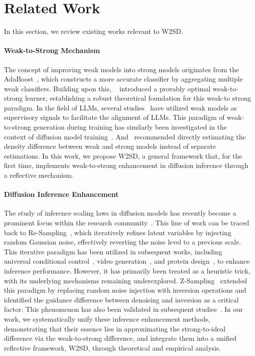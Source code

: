 \section{Related Work}
\label{sec:related_work}
In this section, we review existing works relevant to W2SD.

\paragraph{Weak-to-Strong Mechanism} The concept of improving weak models into strong models originates from the AdaBoost~\citep{hogsgaard2023adaboost}, which constructs a more accurate classifier by aggregating multiple weak classifiers. Building upon this, ~\citet{green2022optimal,hogsgaard2023adaboost} introduced a provably optimal weak-to-strong learner, establishing a robust theoretical foundation for this weak-to strong paradigm. In the field of LLMs, several studies~\citep{chenself,burns2023weak} have utilized weak models as supervisory signals to facilitate the alignment of LLMs. This paradigm of weak-to-strong generation during training has similarly been investigated in the context of diffusion model training~\citep{chen2025pixart}. And~\citet{sugiyama2013density} recommended directly estimating the density difference between weak and strong models instead of separate estimations. In this work, we propose W2SD, a general framework that, for the first time, implements weak-to-strong enhancement in diffusion inference through a reflective mechanism.

\paragraph{Diffusion Inference Enhancement}
The study of inference scaling laws in diffusion models has recently become a prominent focus within the research community~\citep{ma2025inference, yetfg,liu2024alignment}. This line of work can be traced back to Re-Sampling~\citep{lugmayr2022repaint}, which iteratively refines latent variables by injecting random Gaussian noise, effectively reverting the noise level to a previous scale. This iterative paradigm has been utilized in subsequent works, including universal conditional control~\citep{bansal2023universal}, video generation~\citep{wu2023tune}, and protein design~\citep{jumper2021highly}, to enhance inference performance. However, it has primarily been treated as a heuristic trick, with its underlying mechanisms remaining underexplored. Z-Sampling~\citep{bai2024zigzag} extended this paradigm by replacing random noise injection with inversion operations and identified the guidance difference between denoising and inversion as a critical factor. This phenomenon has also been validated in subsequent studies~\citep{zhou2024golden, shao2024iv, ahn2024noise}. In our work, we systematically unify these inference enhancement methods, demonstrating that their essence lies in approximating the strong-to-ideal difference via the weak-to-strong difference, and integrate them into a unified reflective framework, W2SD, through theoretical and empirical analysis.